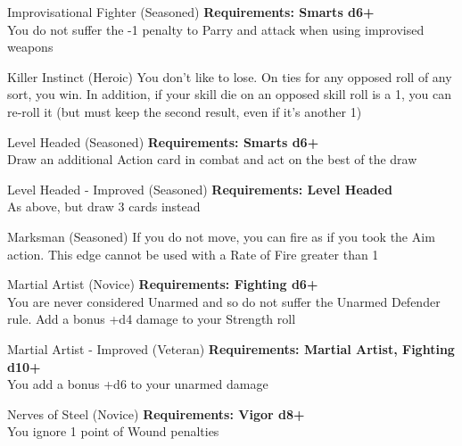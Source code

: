 \begin{multicols}{2}
\begin{genericsection}{Improvisational Fighter (Seasoned)}
\textbf{Requirements: Smarts d6+}\\
You do not suffer the -1 penalty to Parry and attack when using improvised weapons
\end{genericsection}

\begin{genericsection}{Killer Instinct (Heroic)}
You don’t like to lose. On ties for any opposed roll of any sort, you win. In addition, if your skill die on an opposed skill roll is a 1, you can re-roll it (but must keep the second result, even if it’s another 1)
\end{genericsection}

\begin{genericsection}{Level Headed (Seasoned)}
\textbf{Requirements: Smarts d6+}\\
Draw an additional Action card in combat and act on the best of the draw
\end{genericsection}

\begin{genericsection}{Level Headed - Improved (Seasoned)}
\textbf{Requirements: Level Headed}\\
As above, but draw 3 cards instead
\end{genericsection}

\begin{genericsection}{Marksman (Seasoned)}
If you do not move, you can fire as if you took the Aim action. This edge cannot be used with a Rate of Fire greater than 1
\end{genericsection}

\begin{genericsection}{Martial Artist (Novice)}
\textbf{Requirements: Fighting d6+}\\
You are never considered Unarmed and so do not suffer the Unarmed Defender rule. Add a bonus +d4 damage to your Strength roll
\end{genericsection}

\begin{genericsection}{Martial Artist - Improved (Veteran)}
\textbf{Requirements: Martial Artist, Fighting d10+}\\
You add a bonus +d6 to your unarmed damage
\end{genericsection}

\begin{genericsection}{Nerves of Steel (Novice)}
\textbf{Requirements: Vigor d8+}\\
You ignore 1 point of Wound penalties
\end{genericsection}


\end{multicols}
